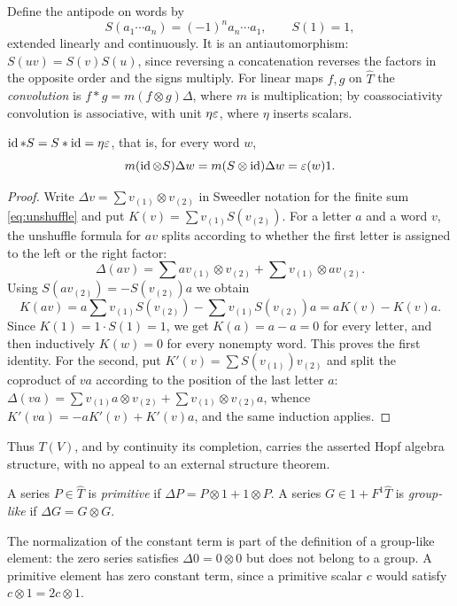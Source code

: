 Define the antipode on words by
\begin{equation}\label{eq:antipode}
 S(a_1\cdots a_n)=(-1)^n a_n\cdots a_1,\qquad S(1)=1,
\end{equation}
extended linearly and continuously. It is an antiautomorphism:
$S(uv)=S(v)S(u)$, since reversing a concatenation reverses the factors in
the opposite order and the signs multiply. For linear maps $f,g$ on
$\widehat T$ the \emph{convolution} is $f*g=m(f\otimes g)\Delta$, where $m$
is multiplication; by coassociativity convolution is associative, with unit
$\eta\varepsilon$, where $\eta$ inserts scalars.

\begin{lemma}\label{lem:antipode}
$\operatorname{id}*S=S*\operatorname{id}=\eta\varepsilon$, that is, for every word $w$,
\begin{equation}\label{eq:antipodeidentities}
 m(\operatorname{id}\otimes S)\Delta w=m(S\otimes\operatorname{id})\Delta w=\varepsilon(w)1.
\end{equation}
\end{lemma}
\begin{proof}
Write $\Delta v=\sum v_{(1)}\otimes v_{(2)}$ in Sweedler notation for the
finite sum \eqref{eq:unshuffle} and put $K(v)=\sum v_{(1)}S(v_{(2)})$. For a letter $a$
and a word $v$, the unshuffle formula for $av$ splits according to whether
the first letter is assigned to the left or the right factor:
\[
 \Delta(av)=\sum av_{(1)}\otimes v_{(2)}+\sum v_{(1)}\otimes av_{(2)}.
\]
Using $S(av_{(2)})=-S(v_{(2)})a$ we obtain
\[
 K(av)=a\sum v_{(1)}S(v_{(2)})-\sum v_{(1)}S(v_{(2)})a=aK(v)-K(v)a.
\]
Since $K(1)=1\cdot S(1)=1$, we get $K(a)=a-a=0$ for every letter, and then
inductively $K(w)=0$ for every nonempty word. This proves the first identity.
For the second, put $K'(v)=\sum S(v_{(1)})v_{(2)}$ and split the coproduct of
$va$ according to the position of the last letter $a$:
$\Delta(va)=\sum v_{(1)}a\otimes v_{(2)}+\sum v_{(1)}\otimes v_{(2)}a$, whence
$K'(va)=-aK'(v)+K'(v)a$, and the same induction applies.
\end{proof}
Thus $T(V)$, and by continuity its completion, carries the asserted Hopf
algebra structure, with no appeal to an external structure theorem.

\begin{definition}
A series $P\in\widehat T$ is \emph{primitive} if
$\Delta P=P\otimes1+1\otimes P$. A series $G\in1+F^1\widehat T$ is
\emph{group-like} if $\Delta G=G\otimes G$.
\end{definition}
The normalization of the constant term is part of the definition of a
group-like element: the zero series satisfies $\Delta0=0\otimes0$ but does not
belong to a group. A primitive element has zero constant term, since a
primitive scalar $c$ would satisfy $c\otimes1=2c\otimes1$.

